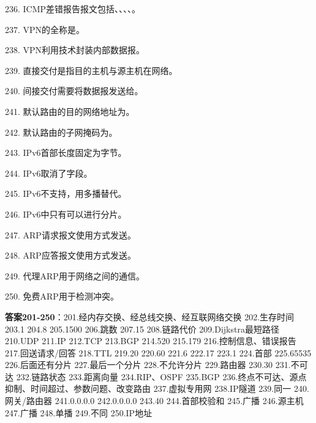 236. ICMP差错报告报文包括\underline{\hspace{2cm}}、\underline{\hspace{2cm}}、\underline{\hspace{2cm}}、\underline{\hspace{2cm}}、\underline{\hspace{2cm}}。

237. VPN的全称是\underline{\hspace{4cm}}。

238. VPN利用\underline{\hspace{2cm}}技术封装内部数据报。

239. 直接交付是指目的主机与源主机在\underline{\hspace{2cm}}网络。

240. 间接交付需要将数据报发送给\underline{\hspace{2cm}}。

241. 默认路由的目的网络地址为\underline{\hspace{2cm}}。

242. 默认路由的子网掩码为\underline{\hspace{2cm}}。

243. IPv6首部长度固定为\underline{\hspace{2cm}}字节。

244. IPv6取消了\underline{\hspace{2cm}}字段。

245. IPv6不支持\underline{\hspace{2cm}}，用多播替代。

246. IPv6中只有\underline{\hspace{2cm}}可以进行分片。

247. ARP请求报文使用\underline{\hspace{2cm}}方式发送。

248. ARP应答报文使用\underline{\hspace{2cm}}方式发送。

249. 代理ARP用于\underline{\hspace{2cm}}网络之间的通信。

250. 免费ARP用于检测\underline{\hspace{2cm}}冲突。

\textbf{答案201-250}：201.经内存交换、经总线交换、经互联网络交换 202.生存时间 203.1 204.8 205.1500 206.跳数 207.15 208.链路代价 209.Dijkstra最短路径 210.UDP 211.IP 212.TCP 213.BGP 214.520 215.179 216.控制信息、错误报告 217.回送请求/回答 218.TTL 219.20 220.60 221.6 222.17 223.1 224.首部 225.65535 226.后面还有分片 227.最后一个分片 228.不允许分片 229.路由器 230.30 231.不可达 232.链路状态 233.距离向量 234.RIP、OSPF 235.BGP 236.终点不可达、源点抑制、时间超过、参数问题、改变路由 237.虚拟专用网 238.IP隧道 239.同一 240.网关/路由器 241.0.0.0.0 242.0.0.0.0 243.40 244.首部校验和 245.广播 246.源主机 247.广播 248.单播 249.不同 250.IP地址


